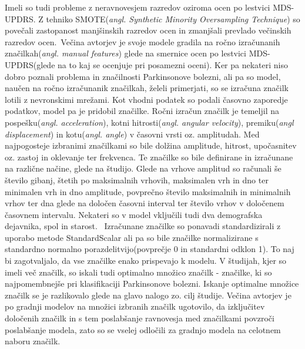 \documentclass[a4paper,12pt]{article}  %
\begin{document}
Imeli so tudi probleme z neravnovesjem razredov oziroma ocen po lestvici MDS-UPDRS. Z tehniko SMOTE(\textit{angl. 
Synthetic Minority Oversampling Technique}) so povečali zastopanost manjšinskih razredov ocen in zmanjšali 
prevlado večinskih razredov ocen.\
Večina avtorjev je svoje modele gradila na ročno izračunanih značilkah(\textit{angl. manual features}) glede na 
smernice ocen po lestvici MDS-UPDRS(glede na to kaj se ocenjuje pri posamezni oceni). Ker pa nekateri 
niso dobro poznali problema in značilnosti Parkinsonove bolezni, ali pa so model, naučen na ročno izračunanik 
značilkah, želeli primerjati, so se izračuna značilk lotili z nevronskimi mrežami. Kot vhodni podatek so podali 
časovno zaporedje podatkov, model pa je pridobil značilke. Ročni izračun značilk je temeljil na pospešku(\textit{angl. 
acceleration}), kotni hitrosti(\textit{angl. angular velocity}), premiku(\textit{angl displacement}) in kotu(\textit{angl. angle}) v 
časovni vrsti oz. amplitudah. Med najpogosteje izbranimi značilkami so bile dolžina amplitude, hitrost, 
upočasnitev oz. zastoj in oklevanje ter frekvenca. Te značilke so bile definirane in izračunane na različne 
načine, glede na študijo. Glede na vrhove amplitud so računali še število gibanj, štetih po maksimalnih 
vrhovih, maksimalen vrh in dno ter minimalen vrh in dno amplitude, povprečno število maksimalnih in 
minimalnih vrhov ter dna glede na določen časovni interval ter število vrhov v določenem časovnem 
intervalu. Nekateri so v model vključili tudi dva demografska dejavnika, spol in starost. \
Izračunane značilke so ponavadi standardizirali z uporabo metode StandardScalar ali pa so bile značilke 
normalizirane s standardno normalno porazdelitvijo(povprečje 0 in standardni odklon 1). To naj bi zagotvaljalo, 
da vse značilke enako prispevajo k modelu. V študijah, kjer so imeli več značilk, so iskali tudi optimalno 
množico značilk - značilke, ki so najpomembnejše pri klasifikaciji Parkinsonove bolezni. Iskanje optimalne 
množice značilk se je razlikovalo glede na glavo nalogo zo. cilj študije. Večina avtorjev je po gradnji modelov 
na množici izbranih značilk ugotovilo, da izključitev določenih značilk in s tem poslabšanje ravnovesja med 
značilkami povzroči poslabšanje modela, zato so se vselej odločili za gradnjo modela na celotnem naboru značilk. \\
\end{document}
